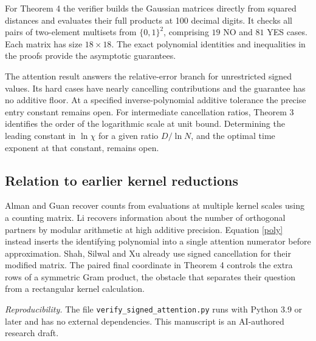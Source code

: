 \documentclass[11pt,letterpaper]{article}
\begin{document}
For Theorem 4 the verifier builds the Gaussian matrices directly from squared distances and evaluates their full products at 100 decimal digits. It checks all pairs of two-element multisets from $\{0,1\}^2$, comprising $19$ NO and $81$ YES cases. Each matrix has size $18\times18$. The exact polynomial identities and inequalities in the proofs provide the asymptotic guarantees.

The attention result answers the relative-error branch for unrestricted signed values. Its hard cases have nearly cancelling contributions and the guarantee has no additive floor. At a specified inverse-polynomial additive tolerance the precise entry constant remains open. For intermediate cancellation ratios, Theorem 3 identifies the order of the logarithmic scale at unit bound. Determining the leading constant in $\ln\chi$ for a given ratio $D/\ln N$, and the optimal time exponent at that constant, remains open.
\newpage

\subsection*{Relation to earlier kernel reductions}
Alman and Guan \cite{ag} recover counts from evaluations at multiple kernel scales using a counting matrix. Li \cite[Theorem 4.1]{li} recovers information about the number of orthogonal partners by modular arithmetic at high additive precision. Equation \eqref{poly} instead inserts the identifying polynomial into a single attention numerator before approximation. Shah, Silwal and Xu \cite{ssx} already use signed cancellation for their modified matrix. The paired final coordinate in Theorem 4 controls the extra rows of a symmetric Gram product, the obstacle that separates their question from a rectangular kernel calculation.

\smallskip
\textit{Reproducibility.} The file \texttt{verify\_signed\_attention.py} runs with Python 3.9 or later and has no external dependencies. This manuscript is an AI-authored research draft.
\end{document}
